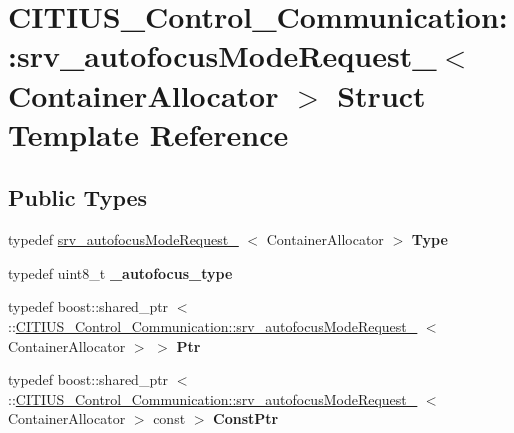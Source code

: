 \hypertarget{struct_c_i_t_i_u_s___control___communication_1_1srv__autofocus_mode_request__}{\section{\-C\-I\-T\-I\-U\-S\-\_\-\-Control\-\_\-\-Communication\-:\-:srv\-\_\-autofocus\-Mode\-Request\-\_\-$<$ \-Container\-Allocator $>$ \-Struct \-Template \-Reference}
\label{struct_c_i_t_i_u_s___control___communication_1_1srv__autofocus_mode_request__}
}
\subsection*{\-Public \-Types}
\begin{DoxyCompactItemize}
\item 
\hypertarget{struct_c_i_t_i_u_s___control___communication_1_1srv__autofocus_mode_request___a419ed0bbc56d0ea523dec8d428adce86}{typedef \*
\hyperlink{struct_c_i_t_i_u_s___control___communication_1_1srv__autofocus_mode_request__}{srv\-\_\-autofocus\-Mode\-Request\-\_\-}\*
$<$ \-Container\-Allocator $>$ {\bfseries \-Type}}\label{struct_c_i_t_i_u_s___control___communication_1_1srv__autofocus_mode_request___a419ed0bbc56d0ea523dec8d428adce86}

\item 
\hypertarget{struct_c_i_t_i_u_s___control___communication_1_1srv__autofocus_mode_request___ab0f3fa3e5730434b0aaeebffb28505e8}{typedef uint8\-\_\-t {\bfseries \-\_\-autofocus\-\_\-type}}\label{struct_c_i_t_i_u_s___control___communication_1_1srv__autofocus_mode_request___ab0f3fa3e5730434b0aaeebffb28505e8}

\item 
\hypertarget{struct_c_i_t_i_u_s___control___communication_1_1srv__autofocus_mode_request___a6121d2bd05508a16b6ab0697795ca44f}{typedef boost\-::shared\-\_\-ptr\*
$<$ \-::\hyperlink{struct_c_i_t_i_u_s___control___communication_1_1srv__autofocus_mode_request__}{\-C\-I\-T\-I\-U\-S\-\_\-\-Control\-\_\-\-Communication\-::srv\-\_\-autofocus\-Mode\-Request\-\_\-}\*
$<$ \-Container\-Allocator $>$ $>$ {\bfseries \-Ptr}}\label{struct_c_i_t_i_u_s___control___communication_1_1srv__autofocus_mode_request___a6121d2bd05508a16b6ab0697795ca44f}

\item 
\hypertarget{struct_c_i_t_i_u_s___control___communication_1_1srv__autofocus_mode_request___a6918f38f25bbbcd3a18df99980f1b615}{typedef boost\-::shared\-\_\-ptr\*
$<$ \-::\hyperlink{struct_c_i_t_i_u_s___control___communication_1_1srv__autofocus_mode_request__}{\-C\-I\-T\-I\-U\-S\-\_\-\-Control\-\_\-\-Communication\-::srv\-\_\-autofocus\-Mode\-Request\-\_\-}\*
$<$ \-Container\-Allocator $>$ const  $>$ {\bfseries \-Const\-Ptr}}\label{struct_c_i_t_i_u_s___control___communication_1_1srv__autofocus_mode_request___a6918f38f25bbbcd3a18df99980f1b615}

\end{DoxyCompactItemize}
